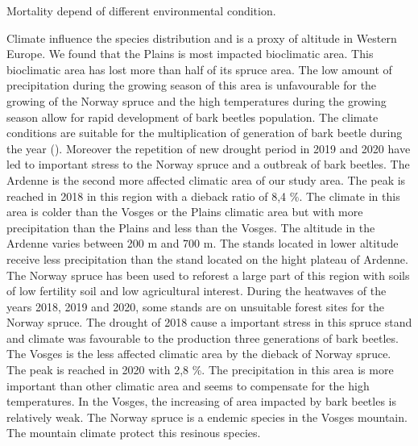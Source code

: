 \documentclass[3p,procedia]{elsarticle}
\begin{document}
Mortality depend of different environmental condition.

Climate influence the species distribution and is a proxy of altitude in Western Europe.
We found that the Plains is most impacted bioclimatic area.
This bioclimatic area has lost more than half of its spruce area.
The low amount of precipitation during the growing season of this area is unfavourable for the growing of the Norway spruce and the high temperatures during the growing season allow for rapid development of bark beetles population.
The climate conditions are suitable for the multiplication of generation of bark beetle during the year (\citep{annila_influence_1969,baier_phenipscomprehensive_2007}).
Moreover the repetition of new drought period in 2019 and 2020 have led to important stress to the Norway spruce and a outbreak of bark beetles. 
The Ardenne is the second more affected climatic area of our study area.
The peak is reached in 2018 in this region with a dieback ratio of 8,4 \%.  
The climate in this area is colder than the Vosges or the Plains climatic area but with more precipitation than the Plains and less than the Vosges.
The altitude in the Ardenne varies between 200 m and 700 m. The stands located in lower altitude receive less precipitation than the stand located on the hight plateau of Ardenne.
The Norway spruce has been used to reforest a large part of this region with soils of low fertility soil and low agricultural interest. 
During the heatwaves of the years 2018, 2019 and 2020, some stands are on unsuitable forest sites for the Norway spruce. 
The drought of 2018 cause a important stress in this spruce stand and climate was favourable to the production three generations of bark beetles.
The Vosges is the less affected climatic area by the dieback of Norway spruce.
The peak is reached in 2020 with 2,8 \%.
The precipitation in this area is more important than other climatic area and seems to compensate for the high temperatures.
In the Vosges, the increasing of area impacted by bark beetles is relatively weak.
The Norway spruce is a endemic species in the Vosges mountain. 
The mountain climate protect this resinous species. 
\end{document}
